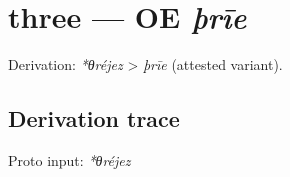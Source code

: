 \documentclass[
  british,
  a4paper,
  openany]{book}
\providecommand{\texorpdfstring}[2]{#1}
\begin{document}
\section{\texorpdfstring{three --- OE
\emph{þrīe}}{three --- OE þrīe}}\label{three-oe-uxferux12be}


Derivation: \emph{*θréjez} \textgreater{} \emph{þrīe} (attested
variant).

\subsection{Derivation trace}\label{derivation-trace-72}

Proto input: \emph{*θréjez}

\begingroup
\setlength{\fboxsep}{6pt}
\end{document}
